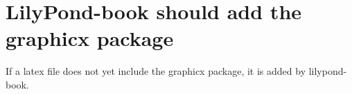 \documentclass[a4paper]{article}
\begin{document}
\section{LilyPond-book should add the graphicx package}

If a latex file does not yet include the graphicx package, it is added by
lilypond-book.
\end{document}
